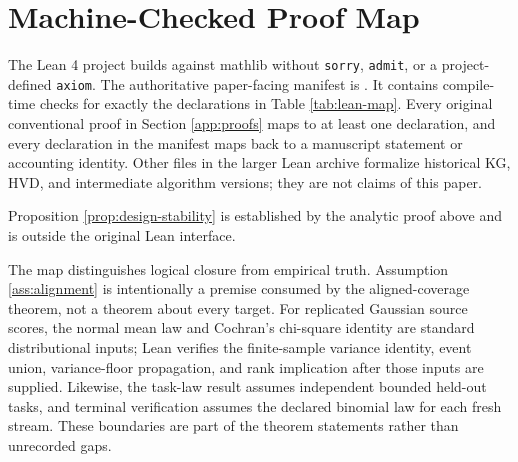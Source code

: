 \section{Machine-Checked Proof Map}\label{app:lean}

The Lean 4 project builds against mathlib without \texttt{sorry},
\texttt{admit}, or a project-defined \texttt{axiom}.  The authoritative
paper-facing manifest is
.  It contains compile-time checks
for exactly the declarations in Table \ref{tab:lean-map}.  Every original conventional
proof in Section \ref{app:proofs} maps to at least one declaration, and every
declaration in the manifest maps back to a manuscript statement or accounting
identity.  Other files in the larger Lean archive formalize historical KG,
HVD, and intermediate algorithm versions; they are not claims of this paper.

Proposition \ref{prop:design-stability} is established by the analytic proof
above and is outside the original Lean interface.

The map distinguishes logical closure from empirical truth.  Assumption
\ref{ass:alignment} is intentionally a premise consumed by the aligned-coverage
theorem, not a theorem about every target.  For replicated Gaussian source
scores, the normal mean law and Cochran's chi-square identity are standard
distributional inputs; Lean verifies the finite-sample variance identity,
event union, variance-floor propagation, and rank implication after those
inputs are supplied.  Likewise, the task-law result assumes independent
bounded held-out tasks, and terminal verification assumes the declared
binomial law for each fresh stream.  These boundaries are part of the theorem
statements rather than unrecorded gaps.

